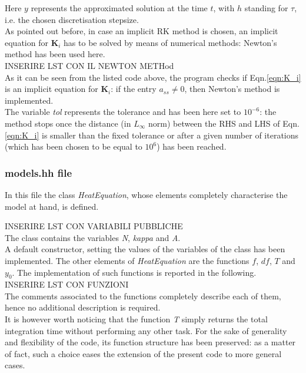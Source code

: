\documentclass[11pt]{article}
\theoremstyle{theorem}
\theoremstyle{definition}
\begin{document}
Here $y$ represents the approximated solution at the time $t$, with $h$ standing for $\tau$, i.e. the chosen discretisation stepsize.\\
As pointed out before, in case an implicit RK method is chosen, an implicit equation for $\mathbf{K}_i$ has to be solved by means of numerical methods: Newton's method has been used here.\\

INSERIRE LST CON IL NEWTON METHod\\

As it can be seen from the listed code above, the program checks if Eqn.\eqref{eqn:K_i} is an implicit equation for $\mathbf{K}_i$: if the entry $a_{ss}\neq 0$, then Newton's method is implemented.\\
The variable \emph{tol} represents the tolerance and has been here set to $10^{-6}$: the method stops once the distance (in $L_\infty$ norm) between the RHS and LHS of Eqn.\eqref{eqn:K_i} is smaller than the fixed tolerance or after a given number of iterations (which has been chosen to be equal to $10^6$) has been reached.\\

\subsubsection{models.hh file}
\label{subsubsec:models}
In this file the class \emph{HeatEquation}, whose elements completely characterise the model at hand, is defined.

INSERIRE LST CON VARIABILI PUBBLICHE \\

The class contains the variables \emph{N}, \emph{kappa} and \emph{A}.\\
A default constructor, setting the values of the variables of the class has been implemented. The other elements of \emph{HeatEquation} are the functions $f$, $df$, $T$ and $y_0$. The implementation of such functions is reported in the following.\\

INSERIRE LST CON FUNZIONI\\

The comments associated to the functions completely describe each of them, hence no additional description is required.\\
It is however worth noticing that the function \emph{T} simply returns the total integration time without performing any other task. For the sake of generality and flexibility of the code, its function structure has been preserved: as a matter of fact, such a choice eases the extension of the present code to more general cases.\\
\end{document}
